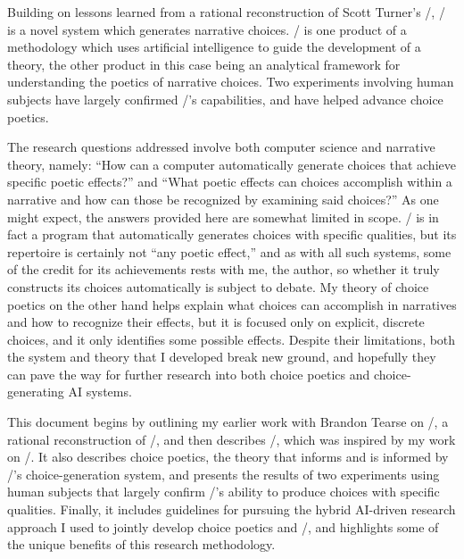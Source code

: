 Building on lessons learned from a rational reconstruction of Scott Turner's \minstrel/, \dunyazad/ is a novel system which generates narrative choices.
%
\dunyazad/ is one product of a methodology which uses artificial intelligence to guide the development of a theory, the other product in this case being an analytical framework for understanding the poetics of narrative choices.
%
Two experiments involving human subjects have largely confirmed \dunyazad/'s capabilities, and have helped advance choice poetics.


The research questions addressed involve both computer science and narrative theory, namely: ``How can a computer automatically generate choices that achieve specific poetic effects?'' and ``What poetic effects can choices accomplish within a narrative and how can those be recognized by examining said choices?''
%
As one might expect, the answers provided here are somewhat limited in scope.
%
\dunyazad/ is in fact a program that automatically generates choices with specific qualities, but its repertoire is certainly not ``any poetic effect,'' and as with all such systems, some of the credit for its achievements rests with me, the author, so whether it truly constructs its choices automatically is subject to debate.
%
My theory of choice poetics on the other hand helps explain what choices can accomplish in narratives and how to recognize their effects, but it is focused only on explicit, discrete choices, and it only identifies some possible effects.
%
Despite their limitations, both the system and theory that I developed break new ground, and hopefully they can pave the way for further research into both choice poetics and choice-generating AI systems.


This document begins by outlining my earlier work with Brandon Tearse on \skald/, a rational reconstruction of \minstrel/, and then describes \dunyazad/, which was inspired by my work on \skald/.
%
It also describes choice poetics, the theory that informs and is informed by \dunyazad/'s choice-generation system, and presents the results of two experiments using human subjects that largely confirm \dunyazad/'s ability to produce choices with specific qualities.
%
Finally, it includes guidelines for pursuing the hybrid AI-driven research approach I used to jointly develop choice poetics and \dunyazad/, and highlights some of the unique benefits of this research methodology.
